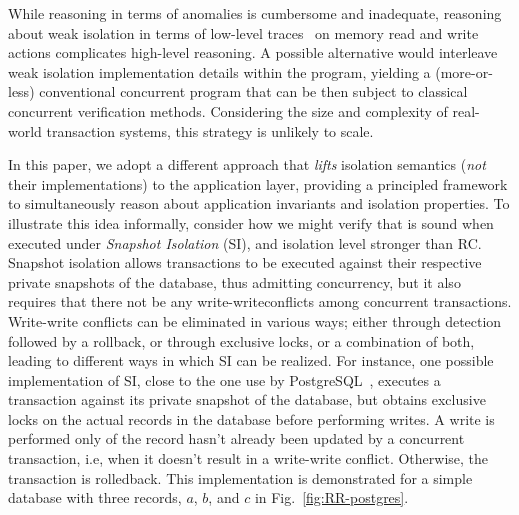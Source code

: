 While reasoning in terms of anomalies is cumbersome and inadequate,
reasoning about weak isolation in terms of low-level
traces~\cite{adyaphd,gotsmanconcur15} on memory read and write actions
complicates high-level reasoning.  A possible alternative would
interleave weak isolation implementation details within the program,
yielding a (more-or-less) conventional concurrent program that can be
then subject to classical concurrent verification methods.
Considering the size and complexity of real-world transaction systems,
this strategy is unlikely to scale.

In this paper, we adopt a different approach that \emph{lifts}
isolation semantics (\emph{not} their implementations) to the
application layer, providing a principled framework to simultaneously
reason about application invariants and isolation properties.  To
illustrate this idea informally, consider how we might verify that
 is sound when executed under \emph{Snapshot Isolation}
(SI), and isolation level stronger than RC. Snapshot isolation
allows transactions to be executed against their respective private
snapshots of the database, thus admitting concurrency, but it also
requires that there not be any write-writeconflicts among
concurrent transactions. Write-write conflicts can be eliminated in various
ways; either through detection followed by a rollback, or through
exclusive locks, or a combination of both, leading to different ways
in which SI can be realized. For instance, one possible implementation
of SI, close to the one use by PostgreSQL~\cite{postgres-ssi},
executes a transaction against its private snapshot of the database,
but obtains exclusive locks on the actual records in the database
before performing writes. A write is performed only of the record
hasn't already been updated by a concurrent transaction, i.e,  when it
doesn't result in a write-write conflict.  Otherwise, the transaction is
rolledback. This implementation is demonstrated for a simple database
with three records, $a$, $b$, and $c$ in Fig.~\ref{fig:RR-postgres}.

